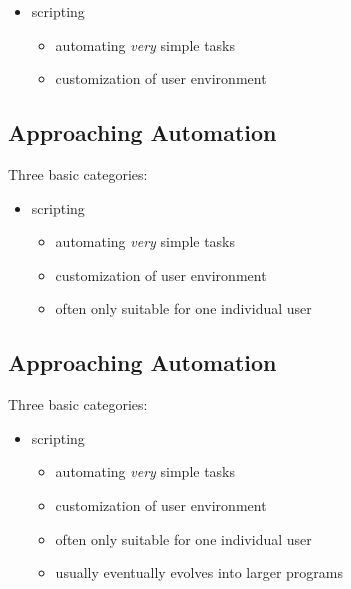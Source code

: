 \documentclass[xga]{xdvislides}
\begin{document}
\begin{itemize}
	\item scripting
		\begin{itemize}
			\item automating {\em very} simple tasks
			\item customization of user environment
		\end{itemize}
\end{itemize}

\subsection{Approaching Automation}
Three basic categories:
\\

\begin{itemize}
	\item scripting
		\begin{itemize}
			\item automating {\em very} simple tasks
			\item customization of user environment
			\item often only suitable for one individual user
		\end{itemize}
\end{itemize}

\subsection{Approaching Automation}
Three basic categories:
\\

\begin{itemize}
	\item scripting
		\begin{itemize}
			\item automating {\em very} simple tasks
			\item customization of user environment
			\item often only suitable for one individual user
			\item usually eventually evolves into larger programs
		\end{itemize}
\end{itemize}
\end{document}
